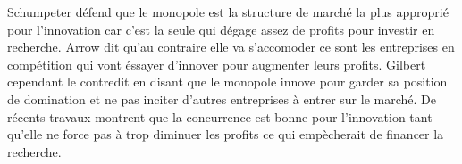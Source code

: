 Schumpeter défend que le monopole est la structure de marché la plus approprié pour l'innovation car c'est la seule qui dégage assez de profits pour investir en recherche. Arrow dit qu'au contraire elle va s'accomoder ce sont les entreprises en compétition qui vont éssayer d'innover pour augmenter leurs profits. Gilbert cependant le contredit en disant que le monopole innove pour garder sa position de domination et ne pas inciter d'autres entreprises à entrer sur le marché. De récents travaux montrent que la concurrence est bonne pour l'innovation tant qu'elle ne force pas à trop diminuer les profits ce qui empècherait de financer la recherche.







